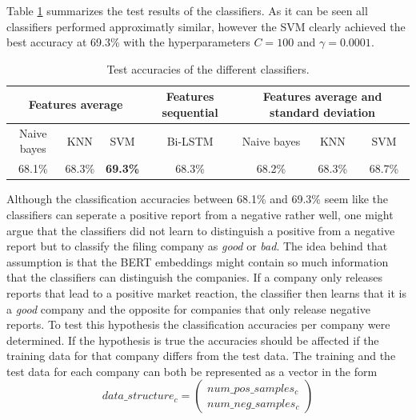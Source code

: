 Table \ref{table:test_results} summarizes the test results of the classifiers.
As it can be seen all classifiers performed approximatly similar, however the \ac{SVM} clearly achieved the best accuracy at 69.3\% with the hyperparameters $C=100$ and $\gamma=0.0001$.
\begin{table}[h]
    \begin{tabular}{ c | c | c || c || c | c | c }
        \multicolumn{3}{c||}{Features average} & Features sequential & \multicolumn{3}{c}{Features average and standard deviation} \\ \hline
        Naive bayes & KNN & SVM & Bi-LSTM & Naive bayes & KNN & SVM \\ \hline
        68.1\% & 68.3\% & \textbf{69.3\%} & 68.3\% & 68.2\% & 68.3\% & 68.7\% 
    \end{tabular}
    \caption{Test accuracies of the different classifiers.}
    \label{table:test_results}
\end{table}
Although the classification accuracies between 68.1\% and 69.3\% seem like the classifiers can seperate a positive report from a negative rather well, one might argue that the classifiers did not learn to distinguish a positive from a negative report but to classify the filing company as \textit{good} or \textit{bad}.
The idea behind that assumption is that the \ac{BERT} embeddings might contain so much information that the classifiers can distinguish the companies.
If a company only releases reports that lead to a positive market reaction, the classifier then learns that it is a \textit{good} company and the opposite for companies that only release negative reports.
To test this hypothesis the classification accuracies per company were determined.
If the hypothesis is true the accuracies should be affected if the training data for that company differs from the test data.
The training and the test data for each company can both be represented as a vector in the form
\begin{equation}
    data\_structure_{c} = \begin{pmatrix}num\_pos\_samples_{c}\\num\_neg\_samples_{c}\end{pmatrix}
    \label{equation:data_structure_train}
\end{equation}
